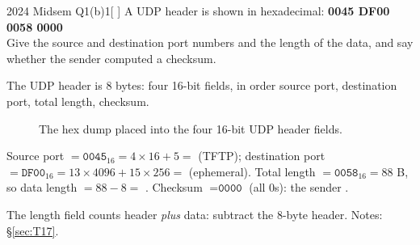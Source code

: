 \begin{question}{2024 Midsem Q1(b)}{1}[ ]
A UDP header is shown in hexadecimal: \textbf{0045 DF00 0058 0000}\\
 Give the source and destination port numbers and the length of the data, and say whether the sender computed a checksum.
\end{question}
\label{q:MS2024-1b}
\begin{solution}
The UDP header is 8 bytes: four 16-bit fields, in order source port, destination port, total length, checksum. 
\begin{figure}[H]\centering
{}
\caption{The hex dump placed into the four 16-bit UDP header fields.}
\end{figure}
Source port $=\texttt{0045}_{16}=4\times16+5=$  (TFTP); destination port $=\texttt{DF00}_{16}=13\times4096+15\times256=$  (ephemeral).
Total length $=\texttt{0058}_{16}=88$ B, so data length $=88-8=$ . Checksum $=\texttt{0000}$ (all 0s): the sender .
\end{solution}
\begin{warningbox}The length field counts header \emph{plus} data: subtract the 8-byte header. Notes: \S\ref{sec:T17}.\end{warningbox}

